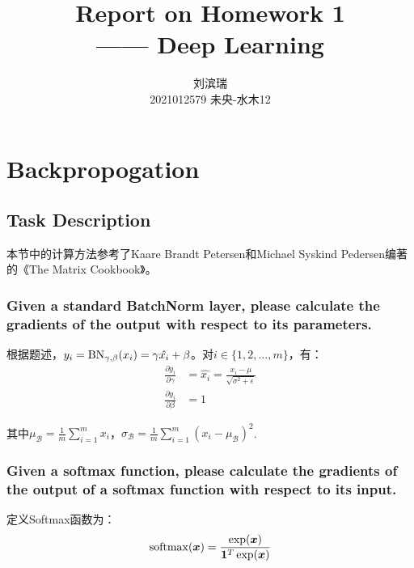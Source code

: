 \documentclass[12pt, a4paper]{article}
\title{{\Huge{\textbf{Report on Homework 1 \\}}} —— Deep Learning}
\author{刘滨瑞 \\ 2021012579 \quad 未央-水木12}
\newcommand{\ivec}{\bm}
\newcommand{\softmax}{{\rm softmax}}
\newcommand{\BN}{{\rm BN}}
\newcommand{\xv}{\ivec{x}}
\begin{document}
\maketitle

\section{Backpropogation}



    \subsection{Task Description}

    本节中的计算方法参考了Kaare Brandt Petersen和Michael Syskind Pedersen编著的《The Matrix Cookbook》。 

    \subsubsection{Given a standard BatchNorm layer, please calculate the gradients of the output with respect to its parameters.}

        根据题述，$y_i = \BN_{\gamma, \beta}(x_i) = \gamma \hat{x_i} + \beta$。对$i \in \{1, 2, ..., m\}$，有：
        \begin{align}
        \frac{\partial{y_i}}{\partial{\gamma}} &= \hat{x_i} = \frac{x_i - \mu}{\sqrt{\sigma^2 + \epsilon}} \\
        \frac{\partial{y_i}}{\partial{\beta}} &= 1
        \end{align}

        其中$\mu_{\mathcal{B}} = \frac{1}{m} \sum_{i=1}^{m} x_i$，$\sigma_{\mathcal{B}} = \frac{1}{m} \sum_{i=1}^{m} (x_i - \mu_{\mathcal{B}})^2$.

    \subsubsection{Given a softmax function, please calculate the gradients of the output of a softmax function with respect to its input.}

        定义Softmax函数为：
        \begin{equation}\begin{aligned}
        \softmax(\xv) = \frac{\exp(\xv)}{\ivec{1}^T \exp(\xv)}
        \end{aligned}\end{equation}
\end{document}
